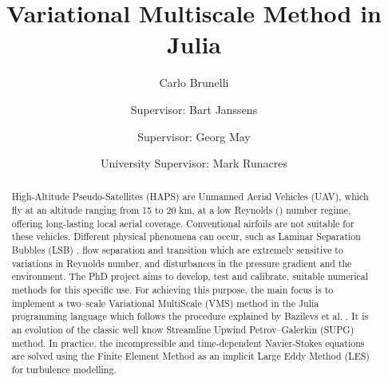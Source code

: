 \documentclass[final,authoryear,3p,times,twocolumn]{vki_phd}
\begin{document}
\begin{frontmatter}


%
%
%
%


\title{Variational Multiscale Method in Julia}
\author{Carlo Brunelli}
\address{Aeronautics and Aerospace Department, von Karman Institute for Fluid Dynamics, Belgium, carlo.brunelli@mil.be}
\author{Supervisor: Bart Janssens}
\address{Associate Professor, Mechanical Engineering Department, Royal Military Academy, Belgium, Bart.Janssens@mil.be}
\author{Supervisor: Georg May}
\address{Associate Professor, Aeronautics and Aerospace Department, von Karman Institute for Fluid Dynamics, Belgium, georg.may@vki.ac.be}
\author{University Supervisor: Mark Runacres}
\address{Professor, Engineering Technology Thermodynamics and Fluid Mechanics Group, VUB, Belgium, mark.runacres@vub.be}

\begin{abstract}
High-Altitude Pseudo-Satellites (HAPS) are Unmanned Aerial Vehicles (UAV), which fly at an altitude ranging from 15 to 20 km, at a low Reynolds () number regime, offering long-lasting local aerial coverage. Conventional airfoils are not suitable for these vehicles. Different physical phenomena can occur, such as Laminar Separation Bubbles (LSB) \cite{Selig1997HighLiftLR, Abhijit13, OMeara87}, flow separation and transition which are extremely sensitive to variations in
Reynolds number, and disturbances in the pressure gradient and the environment. 
The PhD project aims to develop, test and calibrate, suitable numerical methods for this specific use. For achieving this purpose, the main focus is to implement a two–scale Variational MultiScale (VMS) method in the Julia programming language which follows the procedure explained by Bazilevs et al. \cite{Bazilevs2007}. It is an evolution of the classic well know Streamline Upwind Petrov–Galerkin (SUPG) method. In practice, the incompressible and time-dependent Navier-Stokes equations are solved using the Finite Element Method as an implicit Large Eddy Method (LES) for turbulence modelling. 


\end{abstract}
\end{frontmatter}
\end{document}
